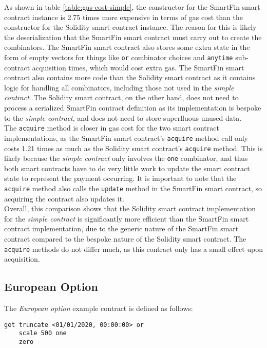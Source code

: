As shown in table \ref{table:gas-cost-simple}, the constructor for the SmartFin smart contract instance is 2.75 times more expensive in terms of gas cost than the constructor for the Solidity smart contract instance. The reason for this is likely the deserialization that the SmartFin smart contract must carry out to create the combinators. The SmartFin smart contract also stores some extra state in the form of empty vectors for things like \texttt{or} combinator choices and \texttt{anytime} sub-contract acquisition times, which would cost extra gas. The SmartFin smart contract also contains more code than the Solidity smart contract as it contains logic for handling all combinators, including those not used in the \textit{simple contract}. The Solidity smart contract, on the other hand, does not need to process a serialized SmartFin contract definition as its implementation is bespoke to the \textit{simple contract}, and does not need to store superfluous unused data. \\

The \texttt{acquire} method is closer in gas cost for the two smart contract implementations, as the SmartFin smart contract's \texttt{acquire} method call only costs 1.21 times as much as the Solidity smart contract's \texttt{acquire} method. This is likely because the \textit{simple contract} only involves the \texttt{one} combinator, and thus both smart contracts have to do very little work to update the smart contract state to represent the payment occurring. It is important to note that the \texttt{acquire} method also calls the \texttt{update} method in the SmartFin smart contract, so acquiring the contract also updates it. \\

Overall, this comparison shows that the Solidity smart contract implementation for the \textit{simple contract} is significantly more efficient than the SmartFin smart contract implementation, due to the generic nature of the SmartFin smart contract compared to the bespoke nature of the Solidity smart contract. The \texttt{acquire} methods do not differ much, as this contract only has a small effect upon acquisition.


\subsection{European Option}

The \textit{European option} example contract is defined as follows:

\begin{Verbatim}[frame=single, samepage=true, rulecolor=\textcolor{black!50}]
get truncate <01/01/2020, 00:00:00> or
    scale 500 one
    zero
\end{Verbatim}

